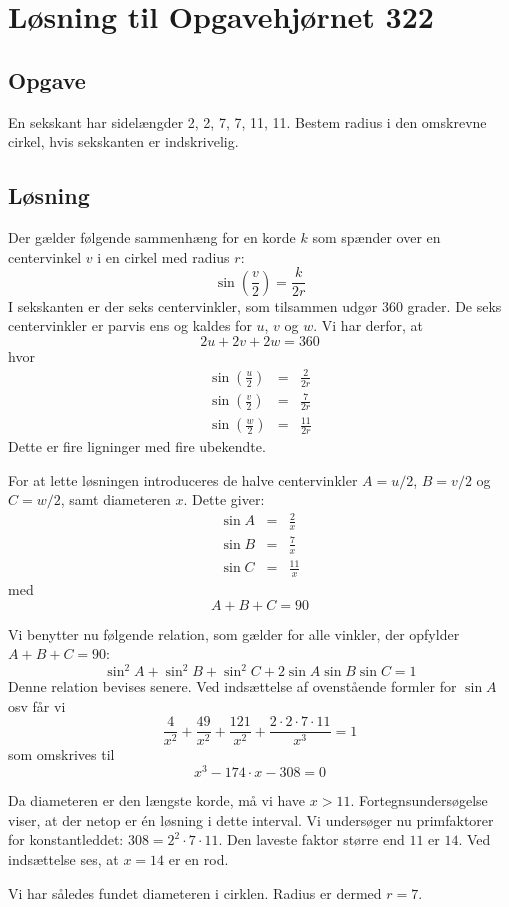 \documentclass[12pt,oneside,a4paper]{article}
\newcommand{\bas}{\begin{eqnarray*}}
\newcommand{\eas}{\end{eqnarray*}}
\begin{document}
\section*{Løsning til Opgavehjørnet 322}

\subsection*{Opgave}
En sekskant har sidelængder 2, 2, 7, 7, 11, 11. Bestem radius
i den omskrevne cirkel, hvis sekskanten er indskrivelig.

\subsection*{Løsning}
Der gælder følgende sammenhæng for en korde $k$ som spænder
over en centervinkel $v$ i en cirkel med radius $r$:
$$
\sin\left(\frac{v}{2}\right) = \frac{k}{2r}
$$
I sekskanten er der seks centervinkler, som tilsammen udgør 360 grader.
De seks centervinkler er parvis ens og kaldes for $u$, $v$ og $w$.
Vi har derfor, at 
$$
2u+2v+2w = 360
$$
hvor
\bas
\sin\left(\frac{u}{2}\right) &=& \frac{2}{2r} \\
\sin\left(\frac{v}{2}\right) &=& \frac{7}{2r} \\
\sin\left(\frac{w}{2}\right) &=& \frac{11}{2r}
\eas
Dette er fire ligninger med fire ubekendte.

For at lette løsningen introduceres de halve centervinkler $A=u/2$, $B=v/2$ og
$C=w/2$, samt diameteren $x$.
Dette giver:
\bas
\sin A &=& \frac{2}{x} \\
\sin B &=& \frac{7}{x} \\
\sin C &=& \frac{11}{x}
\eas
med
$$
A+B+C=90
$$

Vi benytter nu følgende relation, som gælder for alle vinkler, der opfylder $A+B+C=90$:
$$
\sin^2 A + \sin^2 B + \sin^2 C + 2 \sin A \sin B \sin C = 1
$$
Denne relation bevises senere. Ved indsættelse af ovenstående formler for
$\sin A$ osv får vi
$$
\frac{4}{x^2} + \frac{49}{x^2} + \frac{121}{x^2} + \frac{2\cdot2\cdot7\cdot11}{x^3} = 1
$$
som omskrives til
$$
x^3 - 174\cdot x - 308 = 0
$$

Da diameteren er den længste korde, må vi have $x>11$. For\-tegns\-under\-søgelse
viser, at der netop er én løsning i dette interval. Vi undersøger nu
primfaktorer for konstantleddet: $308 = 2^2\cdot 7\cdot 11$. Den laveste faktor
større end $11$ er $14$. Ved indsættelse ses, at $x=14$ er en rod.

Vi har således fundet diameteren i cirklen. Radius er dermed $r=7$.
\end{document}
